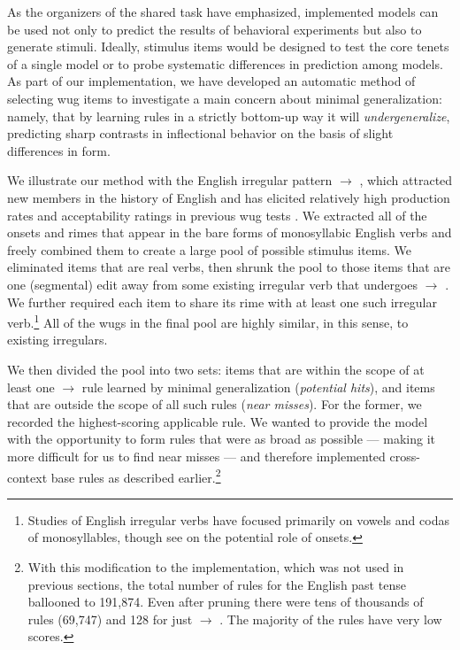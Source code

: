 \documentclass[11pt]{article}
\begin{document}
As the organizers of the shared task have emphasized, implemented models can be used not only to predict the results of behavioral experiments but also to generate stimuli. Ideally, stimulus items would be designed to test the core tenets of a single model or to probe systematic differences in prediction among models. As part of our implementation, we have developed an automatic method of selecting wug items to investigate a main concern about minimal generalization: namely, that by learning rules in a strictly bottom-up way it will \emph{undergeneralize}, predicting sharp contrasts in inflectional behavior on the basis of slight differences in form.

We illustrate our method with the English irregular pattern  $\to$ , which attracted new members in the history of English and has elicited relatively high production rates and acceptability ratings in previous wug tests \citep[e.g.,][]{bybee1983, albright2003}. We extracted all of the onsets and rimes that appear in the bare forms of monosyllabic English verbs and freely combined them to create a large pool of possible stimulus items. We eliminated items that are real verbs, then shrunk the pool to those items that are one (segmental) edit away from some existing irregular verb that undergoes  $\to$ . We further required each item to share its rime with at least one such irregular verb.\footnote{Studies of English irregular verbs have focused primarily on vowels and codas of monosyllables, though see \citet{bybee1983} on the potential role of onsets.}  All of the wugs in the final pool are highly similar, in this sense, to existing irregulars.

We then divided the pool into two sets: items that are within the scope of at least one  $\to$  rule learned by minimal generalization (\emph{potential hits}), and items that are outside the scope of all such rules (\emph{near misses}). For the former, we recorded the highest-scoring applicable rule. We wanted to provide the model with the opportunity to form rules that were as broad as possible --- making it more difficult for us to find near misses --- and therefore implemented cross-context base rules as described earlier.\footnote{With this modification to the implementation, which was not used in previous sections, the total number of rules for the English past tense ballooned to 191,874. Even after pruning there were tens of thousands of rules (69,747) and 128 for just  $\to$ . The majority of the rules have very low scores.}
\end{document}
